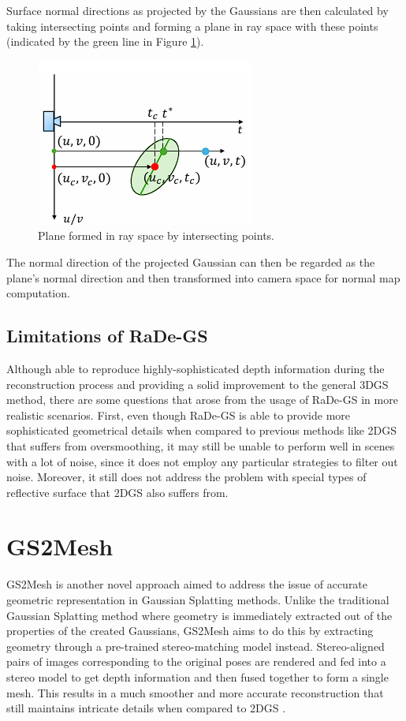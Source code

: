 Surface normal directions as projected by the Gaussians are then calculated by taking intersecting points and forming a plane in ray space with these points (indicated by the green line in Figure \ref{fig:radegs-ray-space}).

\begin{figure}[h]
    \centering
    \includegraphics[width=0.5\linewidth]{figures/radegs-ray-space.png}
    \caption{Plane formed in ray space by intersecting points. \parencite{radegs}}
    \label{fig:radegs-ray-space}
\end{figure}

The normal direction of the projected Gaussian can then be regarded as the plane's normal direction and then transformed into camera space for normal map computation.

\subsection{Limitations of RaDe-GS}

Although able to reproduce highly-sophisticated depth information during the reconstruction process and providing a solid improvement to the general 3DGS method, there are some questions that arose from the usage of RaDe-GS in more realistic scenarios. First, even though RaDe-GS is able to provide more sophisticated geometrical details when compared to previous methods like 2DGS that suffers from oversmoothing, it may still be unable to perform well in scenes with a lot of noise, since it does not employ any particular strategies to filter out noise. Moreover, it still does not address the problem with special types of reflective surface that 2DGS also suffers from.

\section{GS2Mesh}

GS2Mesh \parencite{gs2mesh} is another novel approach aimed to address the issue of accurate geometric representation in Gaussian Splatting methods. Unlike the traditional Gaussian Splatting method \parencite{3DGS} where geometry is immediately extracted out of the properties of the created Gaussians, GS2Mesh aims to do this by extracting geometry through a pre-trained stereo-matching model instead. Stereo-aligned pairs of images corresponding to the original poses are rendered and fed into a stereo model to get depth information and then fused together to form a single mesh. This results in a much smoother and more accurate reconstruction that still maintains intricate details when compared to 2DGS \parencite{2DGS}.

